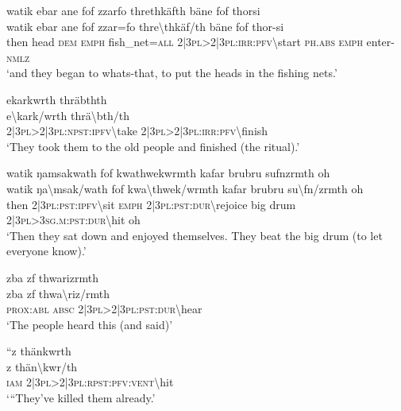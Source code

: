 \ea\label{ex:5:a1607}
watik ebar ane fof zzarfo threthkäfth bäne fof thorsi\\
\gll watik	ebar	ane	fof	zzar=fo	thre{\textbackslash}thkäf/th	bäne	fof	thor-si\\
     then	head	\textsc{dem}	\textsc{emph}	fish\_net=\textsc{all}	2|3\textsc{pl}>2|3\textsc{pl}:\textsc{irr}:\textsc{pfv}{\textbackslash}start	\textsc{ph}.\textsc{abs}	\textsc{emph}	enter-\textsc{nmlz}\\
\glt `and they began to whats-that, to put the heads in the fishing nets.'
\z

\ea\label{ex:5:a1610}
ekarkwrth thräbthth\\
\gll e{\textbackslash}kark/wrth	thrä{\textbackslash}bth/th\\
     2|3\textsc{pl}>2|3\textsc{pl}:\textsc{npst}:\textsc{ipfv}{\textbackslash}take	2|3\textsc{pl}>2|3\textsc{pl}:\textsc{irr}:\textsc{pfv}{\textbackslash}finish\\
\glt `They took them to the old people and finished (the ritual).'
\z

\ea\label{ex:5:a1611}
watik ŋamsakwath fof kwathwekwrmth kafar brubru sufnzrmth oh\\
\gll watik	ŋa{\textbackslash}msak/wath	fof	kwa{\textbackslash}thwek/wrmth	kafar	brubru	su{\textbackslash}fn/zrmth	oh\\
     then	2|3\textsc{pl}:\textsc{pst}:\textsc{ipfv}{\textbackslash}sit	\textsc{emph}	2|3\textsc{pl}:\textsc{pst}:\textsc{dur}{\textbackslash}rejoice	big	drum	2|3\textsc{pl}>3\textsc{sg}.\textsc{m}:\textsc{pst}:\textsc{dur}{\textbackslash}hit	oh\\
\glt `Then they sat down and enjoyed themselves. They beat the big drum (to let everyone know).'
\z

\ea\label{ex:5:a1614}
zba zf thwarizrmth\\
\gll zba	zf	thwa{\textbackslash}riz/rmth\\
     \textsc{prox}:\textsc{abl}	\textsc{absc}	2|3\textsc{pl}>2|3\textsc{pl}:\textsc{pst}:\textsc{dur}{\textbackslash}hear\\
\glt `The people heard this (and said)'
\z

\ea\label{ex:5:a1615}
``z thänkwrth\\
\gll z	thän{\textbackslash}kwr/th\\
     \textsc{iam}	2|3\textsc{pl}>2|3\textsc{pl}:\textsc{rpst}:\textsc{pfv}:\textsc{vent}{\textbackslash}hit\\
\glt `{``}They've killed them already.'
\z

